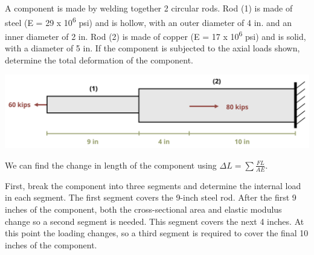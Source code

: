 \documentclass[
  letterpaper,
  DIV=11,
  numbers=noendperiod]{scrreprt}
\begin{document}
\begin{tcolorbox}[enhanced jigsaw, colback=white, colframe=quarto-callout-note-color-frame, leftrule=.75mm, opacitybacktitle=0.6, colbacktitle=quarto-callout-note-color!10!white, arc=.35mm, bottomrule=.15mm, breakable, title={Example 5.3: Axial change in length problem with different loads, areas,
and materials}, left=2mm, titlerule=0mm, toptitle=1mm, toprule=.15mm, opacityback=0, rightrule=.15mm, coltitle=black, bottomtitle=1mm]

A component is made by welding together 2 circular rods. Rod (1) is made
of steel (E = 29 x 10\textsuperscript{6} psi) and is hollow, with an
outer diameter of 4 in. and an inner diameter of 2 in. Rod (2) is made
of copper (E = 17 x 10\textsuperscript{6} psi) and is solid, with a
diameter of 5 in. If the component is subjected to the axial loads
shown, determine the total deformation of the component.

\begin{center}
\includegraphics{images/PNGs/Example 5.3 part 1.png}
\end{center}

\begin{tcolorbox}[enhanced jigsaw, colback=white, colframe=quarto-callout-note-color-frame, leftrule=.75mm, opacitybacktitle=0.6, colbacktitle=quarto-callout-note-color!10!white, arc=.35mm, bottomrule=.15mm, breakable, title={Solution}, left=2mm, titlerule=0mm, toptitle=1mm, toprule=.15mm, opacityback=0, rightrule=.15mm, coltitle=black, bottomtitle=1mm]

We can find the change in length of the component using
\(\Delta L=\sum \frac{F L}{A E}\).

First, break the component into three segments and determine the
internal load in each segment. The first segment covers the 9-inch steel
rod. After the first 9 inches of the component, both the cross-sectional
area and elastic modulus change so a second segment is needed. This
segment covers the next 4 inches. At this point the loading changes, so
a third segment is required to cover the final 10 inches of the
component.


\end{tcolorbox}
\end{tcolorbox}
\end{document}
